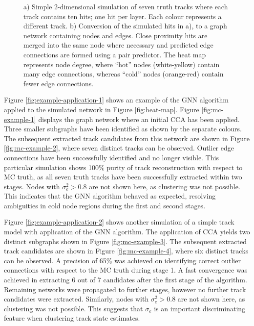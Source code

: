 \begin{center}
\begin{figure}[htbp]
    \caption{a) Simple 2-dimensional simulation of seven truth tracks where each track contains ten hits; one hit per layer. Each colour represents a different track. b) Conversion of the simulated hits in a), to a graph network containing nodes and edges. Close proximity hits are merged into the same node where necessary and predicted edge connections are formed using a pair predictor. The heat map represents node degree, where ``hot'' nodes (white-yellow) contain many edge connections, whereas ``cold'' nodes (orange-red) contain fewer edge connections.}%
    \label{fig:setup}%
\end{figure}
\end{center}



Figure \ref{fig:example-application-1} shows an example of the GNN algorithm applied to the simulated network in Figure \ref{fig:heat-map}. Figure \ref{fig:mc-example-1} displays the graph network where an initial CCA has been applied. Three smaller subgraphs have been identified as shown by the separate colours. The subsequent extracted track candidates from this network are shown in Figure \ref{fig:mc-example-2}, where seven distinct tracks can be observed. Outlier edge connections have been successfully identified and no longer visible. This particular simulation shows 100\% purity of track reconstruction with respect to MC truth, as all seven truth tracks have been successfully extracted within two stages. Nodes with $\sigma_e^2 > 0.8$ are not shown here, as clustering was not possible. This indicates that the GNN algorithm behaved as expected, resolving ambiguities in cold node regions during the first and second stages.

Figure \ref{fig:example-application-2} shows another simulation of a simple track model with application of the GNN algorithm. The application of CCA yields two distinct subgraphs shown in Figure \ref{fig:mc-example-3}. The subsequent extracted track candidates are shown in Figure \ref{fig:mc-example-4}, where six distinct tracks can be observed. A precision of 65\% was achieved on identifying correct outlier connections with respect to the MC truth during stage 1. A fast convergence was achieved in extracting 6 out of 7 candidates after the first stage of the algorithm. Remaining networks were propagated to further stages, however no further track candidates were extracted. Similarly, nodes with $\sigma_e^2 > 0.8$ are not shown here, as clustering was not possible. This suggests that $\sigma_{e}$ is an important discriminating feature when clustering track state estimates. 

